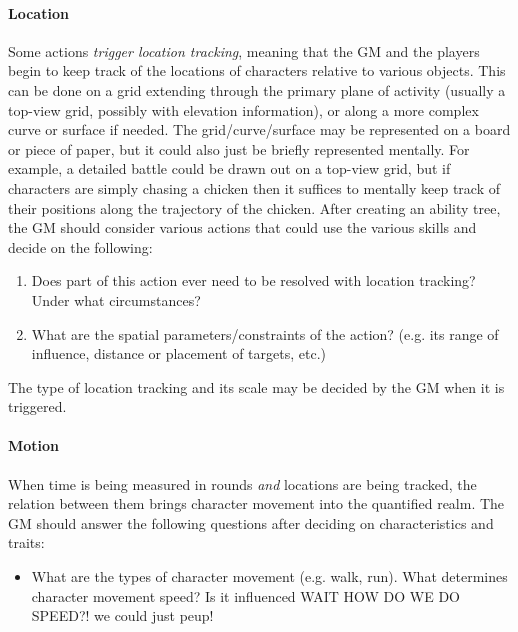 \documentclass[12pt]{article}
\newcommand{\notes}[1]{{\color{Tan} #1}}
\begin{document}
\paragraph{Location}
Some actions \emph{trigger location tracking},
meaning that the GM and the players begin to keep track of the locations of characters relative to various objects.
This can be done on a grid extending through the primary plane of activity (usually a top-view grid, possibly with elevation information),
or along a more complex curve or surface if needed.
The grid/curve/surface may be represented on a board or piece of paper, but it could also just be briefly represented mentally.
For example, a detailed battle could be drawn out on a top-view grid,
but if characters are simply chasing a chicken then it suffices to mentally keep track
of their positions along the trajectory of the chicken.
After creating an ability tree, the GM should consider various actions
that could use the various skills and decide on the following:
\vspace{-1em}
\begin{enumerate}
\item\label{itm:grid:trigger}
Does part of this action ever need to be resolved with location tracking? Under what circumstances?
\item\label{itm:grid:length}
What are the spatial parameters/constraints of the action? (e.g. its range of influence, distance or placement of targets, etc.)
\end{enumerate}
The type of location tracking and its scale may be decided by the GM when it is triggered.



\paragraph{Motion}
When time is being measured in rounds \emph{and} locations are being tracked,
the relation between them brings character movement into the quantified realm.
The GM should answer the following questions after deciding on characteristics and traits:
\vspace{-1em}
\begin{itemize}
\item
What are the types of character movement (e.g. walk, run).
What determines character movement speed?
Is it influenced \notes{WAIT HOW DO WE DO SPEED?! we could just peup!}
\end{itemize}
\end{document}

